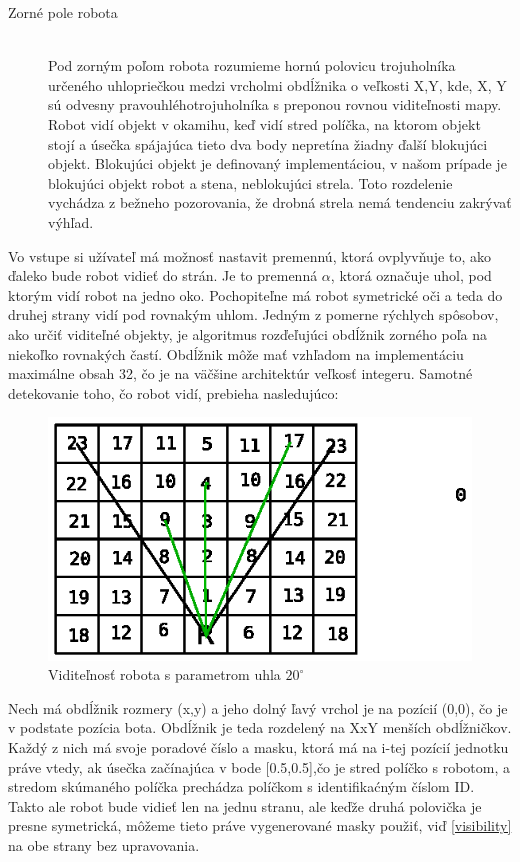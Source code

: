 \begin{description}
\item[Zorné pole robota]\hfill \\
Pod zorným poľom robota rozumieme hornú polovicu trojuholníka určeného uhlopriečkou medzi vrcholmi obdĺžnika o veľkosti X,Y, kde, X, Y sú odvesny pravouhléhotrojuholníka s preponou rovnou viditeľnosti mapy. \\
Robot vidí objekt v okamihu, keď vidí stred políčka, na ktorom objekt stojí a úsečka spájajúca tieto dva body nepretína žiadny ďalší blokujúci objekt. Blokujúci objekt je definovaný implementáciou, v našom prípade je blokujúci objekt robot a stena, neblokujúci strela. Toto rozdelenie vychádza z bežneho pozorovania, že drobná strela nemá tendenciu zakrývať výhľad.
\end{description}
Vo vstupe si užívateľ má možnosť nastavit premennú, ktorá ovplyvňuje to, ako ďaleko bude robot vidieť do strán. Je to premenná $\alpha$, ktorá označuje uhol, pod ktorým vidí robot na jedno oko. Pochopiteľne má robot symetrické oči a teda do druhej strany vidí pod rovnakým uhlom. Jedným z pomerne rýchlych spôsobov, ako určiť viditeľné objekty, je algoritmus rozďeľujúci obdĺžnik zorného poľa na niekoľko rovnakých častí.
Obdĺžnik môže mať vzhľadom na implementáciu maximálne obsah 32, čo je na väčšine architektúr veľkosť integeru. Samotné detekovanie toho, čo robot vidí, prebieha nasledujúco: \\
\begin{figure}
\centering
\includegraphics[totalheight=0.4\textheight,width=.8\textwidth]{visibility}
\caption {Viditeľnosť robota s parametrom uhla $20^\circ$}
\label{fig:visibility}
\end{figure}
Nech má obdĺžnik rozmery (x,y) a jeho dolný ľavý vrchol je na pozícií (0,0), čo je v podstate pozícia bota. Obdĺžnik je teda rozdelený na XxY menších obdĺžničkov. Každý z nich má svoje poradové číslo a masku, ktorá má na i-tej pozícií jednotku práve vtedy, ak úsečka začínajúca v bode [0.5,0.5],čo je stred políčko s robotom, a stredom skúmaného políčka prechádza políčkom s identifikaćným číslom ID. Takto ale robot bude vidieť len na jednu stranu, ale keďže druhá polovička je presne symetrická, môžeme tieto práve vygenerované masky použiť, viď \ref{visibility}  na obe strany bez upravovania. \\
